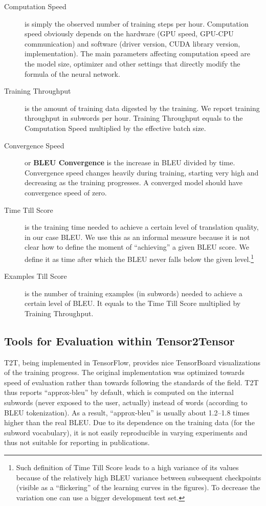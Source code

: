 \documentclass{pbmlarxiv} \pdfoutput=1
\begin{document}
\begin{description}
\item[Computation Speed] is simply the observed number of training steps per hour.
Computation speed obviously depends on the hardware (GPU speed, GPU-CPU communication)
 and software (driver version, CUDA library version, implementation).
The main parameters affecting computation speed are the model size, optimizer
 and other settings that directly modify the formula of the neural network.

\item[Training Throughput] is the amount of training data digested by the
training. We report training throughput in subwords per hour.
Training Throughput equals to the Computation Speed multiplied by the effective batch size.

\item[Convergence Speed] or \textbf{BLEU Convergence} is the increase in BLEU
divided by time. Convergence speed changes heavily during training, starting
very high and decreasing as the training progresses. A converged model should
have convergence speed of zero.

\item[Time Till Score] is the training time needed to
 achieve a certain level of translation quality, in our case BLEU.
 We use this as an informal measure because it is not clear
  how to define the moment of ``achieving'' a given BLEU score.
 We define it as time after which the BLEU never falls below the given level.\footnote{
  Such definition of Time Till Score leads to a high variance of its values
   because of the relatively high BLEU variance between subsequent checkpoints
   (visible as a ``flickering'' of the learning curves in the figures).
  To decrease the variation one can use a bigger development test set.
 }
\item[Examples Till Score] is the number of training examples (in subwords) needed to
 achieve a certain level of BLEU.
 It equals to the Time Till Score multiplied by Training Throughput.
\end{description}


\subsection{Tools for Evaluation within Tensor2Tensor}
\label{sec:tools}

T2T, being implemented in TensorFlow, provides nice TensorBoard visualizations of the training progress. The original implementation was optimized towards speed of evaluation rather than towards following the standards of the field.
T2T thus reports ``approx-bleu'' by default, which is
computed on the internal subwords (never exposed to the user, actually)
instead of words (according to BLEU tokenization).
As a result, ``approx-bleu''
is usually about 1.2--1.8 times higher than the real BLEU. Due to its dependence on the training data (for the subword vocabulary), it is not easily reproducible in varying experiments and thus not suitable for reporting in publications.
\end{document}
